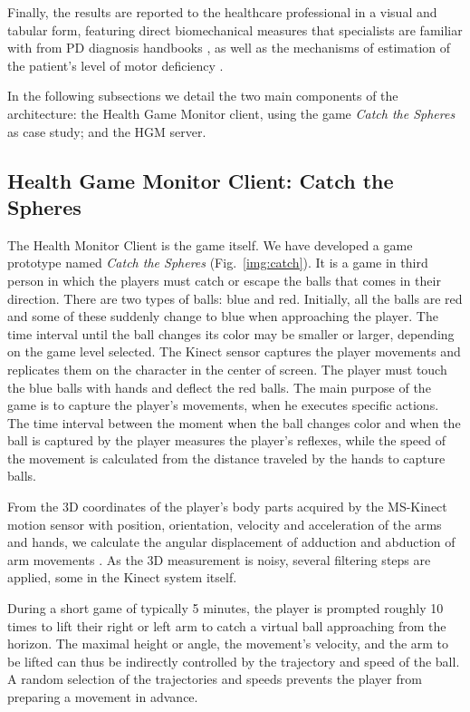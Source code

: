 \documentclass[10pt, conference, compsocconf]{IEEEtran}
\begin{document}
Finally, the results are reported to the healthcare professional in a visual and tabular form, featuring direct biomechanical measures that specialists are familiar with from PD diagnosis handbooks \cite{national2006parkinson}, as well as the mechanisms of estimation of the patient's level of motor deficiency \cite{national2006parkinson}.

In the following subsections we detail the two main components of the architecture: the Health Game Monitor client, using the game \textit{Catch the Spheres} as case study; and the HGM server.

\subsection{Health Game Monitor Client: Catch the Spheres}

The Health Monitor Client is the game itself. We have developed a game prototype named \emph{Catch the Spheres} (Fig.~\ref{img:catch}). It is a game in third person in which the players must catch or escape the balls that comes in their direction. There are two types of balls: blue and red. Initially, all the balls are red and some of these suddenly change to blue when approaching the player. The time interval until the ball changes its color may be smaller or larger, depending on the game level selected. The Kinect sensor captures the player movements and replicates them on the character in the center of screen. The player must touch the blue balls with hands and deflect the red balls. The main purpose of the game is to capture the player's movements, when he executes specific actions. The time interval between the moment when the ball changes color and when the ball is captured by the player measures the player's reflexes, while the speed of the movement is calculated from the distance traveled by the 
hands to capture balls.

From the 3D coordinates of the player's body parts acquired by the MS-Kinect motion sensor with position, orientation, velocity and acceleration of the arms and hands, we calculate the angular displacement of adduction and abduction of arm movements \cite{mcginnis2013biomechanics}. As the 3D measurement is noisy, several filtering steps are applied, some in the Kinect system itself. 

During a short game of typically 5 minutes, the player is prompted roughly 10 times to lift their right or left arm to catch a virtual ball approaching from the horizon. The maximal height or angle, the movement's velocity, and the arm to be lifted can thus be indirectly controlled by the trajectory and speed of the ball. A random selection of the trajectories and speeds prevents the player from preparing a movement in advance.
\end{document}
